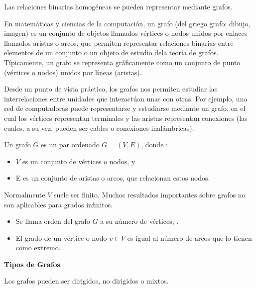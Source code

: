 \documentclass[10pt]{article}
\begin{document}
Las relaciones binarias homogéneas se pueden representar mediante grafos.

En matemáticas y ciencias de la computación, un grafo (del griego grafo: dibujo, imagen) es un conjunto de objetos llamados vértices o nodos unidos por enlaces llamados aristas o arcos, que permiten representar relaciones binarias entre elementos de un conjunto o un objeto de estudio dela teoría de grafos. Típicamente, un grafo se representa gráficamente como un conjunto de punto (vértices o nodos) unidos por líneas (aristas).


Desde un punto de vista práctico, los grafos nos permiten estudiar las interrelaciones entre unidades que interactúan unas con otras. Por ejemplo, una red de computadoras puede representarse y estudiarse mediante un grafo, en el cual los vértices representan terminales y las aristas representan conexiones (las cuales, a su vez, pueden ser cables o conexiones inalámbricas).

Un grafo $G$ es un par ordenado $G = (V,E)$, donde :

\begin{itemize}
\item $V$ es un conjunto de vértices o nodos, y
\item E es un conjunto de aristas o arcos, que relacionan estos nodos.
\end{itemize}


Normalmente $V$ suele ser finito. Muchos resultados importantes sobre grafos no son aplicables para grados infinitos.

\begin{itemize}
\item Se llama orden del grafo $G$ a su número de vértices, .
\item El grado de un vértice o nodo $v \in V$ es igual al número de arcos que lo tienen como extremo.
\end{itemize}

\noindent\textbf{Tipos de Grafos}

Los grafos pueden ser dirigidos, no dirigidos o mixtos.
\end{document}
